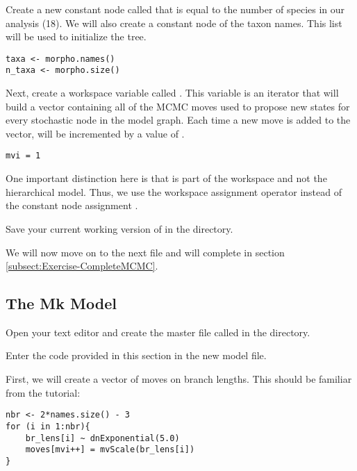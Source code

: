 Create a new constant node called  that is equal to the number of species in our analysis (18). 
We will also create a constant node of the taxon names.
This list will be used to initialize the tree.

{\tt \begin{snugshade*}
\begin{lstlisting}
taxa <- morpho.names()
n_taxa <- morpho.size() 
\end{lstlisting}
\end{snugshade*}}

Next, create a workspace variable called . 
This variable is an iterator that will build a vector containing all of the MCMC moves used to propose new states for every stochastic node in the model graph. 
Each time a new move is added to the vector,  will be incremented by a value of .
{\tt \begin{snugshade*}
\begin{lstlisting}
mvi = 1
\end{lstlisting}
\end{snugshade*}}
One important distinction here is that  is part of the \RevBayes workspace and not the hierarchical model. 
Thus, we use the workspace assignment operator \cl{=} instead of the constant node assignment \cl{<-}. 

{\begin{framed}
Save your current working version of  in the  directory.

We will now move on to the next \Rev file and will complete  in section \ref{subsect:Exercise-CompleteMCMC}.
\end{framed}}


\bigskip
\subsection{The Mk Model}

{\begin{framed}
Open your text editor and create the master \Rev file called {\textcolor{red}{}} in the  directory.

Enter the \Rev code provided in this section in the new model file.
\end{framed}}

First, we will create a vector of moves on branch lengths. 
This should be familiar from the  tutorial:
{\tt \begin{snugshade*}
\begin{lstlisting}
nbr <- 2*names.size() - 3
for (i in 1:nbr){
    br_lens[i] ~ dnExponential(5.0)
    moves[mvi++] = mvScale(br_lens[i]) 
}
\end{lstlisting}
\end{snugshade*}}

